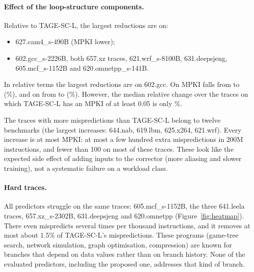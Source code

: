 \paragraph{Effect of the loop-structure components.} Relative to TAGE-SC-L, the largest reductions are on:
\begin{itemize}
\item 627.cam4\_s-490B (MPKI  lower);
\item 602.gcc\_s-2226B, both 657.xz traces, 621.wrf\_s-8100B, 631.deepsjeng, 605.mcf\_s-1152B and 620.omnetpp\_s-141B.
\end{itemize}
In relative terms the largest reductions are on 602.gcc. On  MPKI falls from  to  (\%), and on  from  to  (\%). However, the median relative change over the  traces on which TAGE-SC-L has an MPKI of at least 0.05 is only \%.

The  traces with more mispredictions than TAGE-SC-L belong to twelve benchmarks (the largest increases: 644.nab, 619.lbm, 625.x264, 621.wrf). Every increase is at most  MPKI: at most a few hundred extra mispredictions in 200M instructions, and fewer than 100 on most of these traces. These look like the expected side effect of adding inputs to the corrector (more aliasing and slower training), not a systematic failure on a workload class.

\paragraph{Hard traces.} All predictors struggle on the same traces: 605.mcf\_s-1152B, the three 641.leela traces, 657.xz\_s-2302B, 631.deepsjeng and 620.omnetpp (Figure~\ref{fig:heatmap}). There even \prop{} mispredicts several times per thousand instructions, and it removes at most about 1.5\% of TAGE-SC-L's mispredictions. These programs (game-tree search, network simulation, graph optimisation, compression) are known for branches that depend on data values rather than on branch history. None of the evaluated predictors, including the proposed one, addresses that kind of branch.
